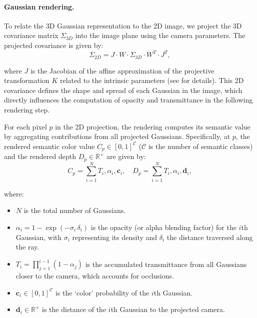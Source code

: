 \paragraph{Gaussian rendering.}
To relate the 3D Gaussian representation to the 2D image, we project the 3D covariance matrix \(\Sigma_{3D}\) into the image plane using the camera parameters. The projected covariance is given by:
\begin{equation}
    \Sigma_{2D} = J \cdot W \cdot \Sigma_{3D} \cdot W^T \cdot J^T,
\end{equation}

where \(J\) is the Jacobian of the affine approximation of the projective transformation \(K\) related to the intrinsic parameters (see \cite{kerbl3Dgaussians} for details).
This 2D covariance defines the shape and spread of each Gaussian in the image, which directly influences the computation of opacity and transmittance in the following rendering step.

{For each pixel $p$ in the 2D projection,} the rendering computes {its semantic value by aggregating contributions from all projected Gaussians.} Specifically, at $p$, the rendered semantic color value $C_p \in [0,1]^\mathcal{C}$ ($\mathcal{C}$ is the number of semantic classes) and the rendered depth $D_p \in \mathbb{R}^{+}$ are given by:
\begin{equation}
C_p = \sum_{i=1}^N T_i, \alpha_i, \mathbf{c}_i, \quad D_p = \sum_{i=1}^N T_i, \alpha_i, \mathbf{d}_i,
\label{eq:color_rendering}
\end{equation}

where:
\begin{itemize}
    \item \(N\) is the {total} number of Gaussians. %
    \item \(\alpha_i = 1 - \exp(-\sigma_i\,\delta_i)\) is the opacity (or alpha blending factor) for the \(i\)th Gaussian, with \(\sigma_i\) representing its density and \(\delta_i\) the distance traversed along the ray.
    \item \(T_i = \prod_{j=1}^{i-1} (1-\alpha_j)\) is the accumulated transmittance from all Gaussians closer to the camera, which accounts for occlusions.
    \item $\mathbf{c}_i {\in [0,1]^\mathcal{C}}$ is the `color' probability of the \(i\)th Gaussian.
    \item $\mathbf{d}_i {\in \mathbb{R}^+}$ is the distance of the \(i\)th Gaussian to the projected camera.
\end{itemize}

